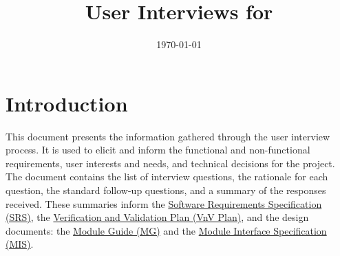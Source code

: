 \documentclass[12pt]{article}
\title{User Interviews for \progname{}}
\author{\authname}
\date{\today}
\begin{document}
\maketitle

\tableofcontents
\newpage
\listoffigures
\newpage

\section{Introduction}
This document presents the information gathered through the user interview process. It is used to elicit and inform the functional and non-functional requirements, user interests and needs, and technical decisions for the project. The document contains the list of interview questions, the rationale for each question, the standard follow-up questions, and a summary of the responses received. These summaries inform the \href{https://github.com/arjunkarthik123/fitness-finance-application/blob/main/pdfs/SRS-Volere/SRS.pdf}{Software Requirements Specification (SRS)}, the \href{https://github.com/arjunkarthik123/fitness-finance-application/blob/main/pdfs/VnVPlan/VnVPlan.pdf}{Verification and Validation Plan (VnV Plan)}, and the design documents: the \href{https://github.com/arjunkarthik123/fitness-finance-application/blob/main/pdfs/Design/SoftArchitecture/MG.pdf}{Module Guide (MG)} and the \href{https://github.com/arjunkarthik123/fitness-finance-application/blob/main/pdfs/Design/SoftDetailedDes/MIS.pdf}{Module Interface Specification (MIS)}. 
\end{document}
